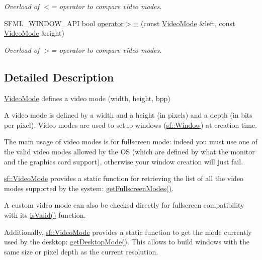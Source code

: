 \begin{DoxyCompactItemize}
\begin{DoxyCompactList}\small\item\em Overload of $<$= operator to compare video modes. \end{DoxyCompactList}\item 
S\+F\+M\+L\+\_\+\+W\+I\+N\+D\+O\+W\+\_\+\+A\+PI bool \hyperlink{classsf_1_1_video_mode_a7f7983e336203d34c9878c77fff60f1f}{operator$>$=} (const \hyperlink{classsf_1_1_video_mode}{Video\+Mode} \&left, const \hyperlink{classsf_1_1_video_mode}{Video\+Mode} \&right)
\begin{DoxyCompactList}\small\item\em Overload of $>$= operator to compare video modes. \end{DoxyCompactList}\end{DoxyCompactItemize}


\subsection{Detailed Description}
\hyperlink{classsf_1_1_video_mode}{Video\+Mode} defines a video mode (width, height, bpp) 

A video mode is defined by a width and a height (in pixels) and a depth (in bits per pixel). Video modes are used to setup windows (\hyperlink{classsf_1_1_window}{sf\+::\+Window}) at creation time.

The main usage of video modes is for fullscreen mode\+: indeed you must use one of the valid video modes allowed by the OS (which are defined by what the monitor and the graphics card support), otherwise your window creation will just fail.

\hyperlink{classsf_1_1_video_mode}{sf\+::\+Video\+Mode} provides a static function for retrieving the list of all the video modes supported by the system\+: \hyperlink{classsf_1_1_video_mode_a6815b9b3b35767d5b4563fbed4bfc67b}{get\+Fullscreen\+Modes()}.

A custom video mode can also be checked directly for fullscreen compatibility with its \hyperlink{classsf_1_1_video_mode_ad5e04c044b0925523c75ecb173d2129a}{is\+Valid()} function.

Additionally, \hyperlink{classsf_1_1_video_mode}{sf\+::\+Video\+Mode} provides a static function to get the mode currently used by the desktop\+: \hyperlink{classsf_1_1_video_mode_ac1be160a4342e6eafb2cb0e8c9b18d44}{get\+Desktop\+Mode()}. This allows to build windows with the same size or pixel depth as the current resolution.

